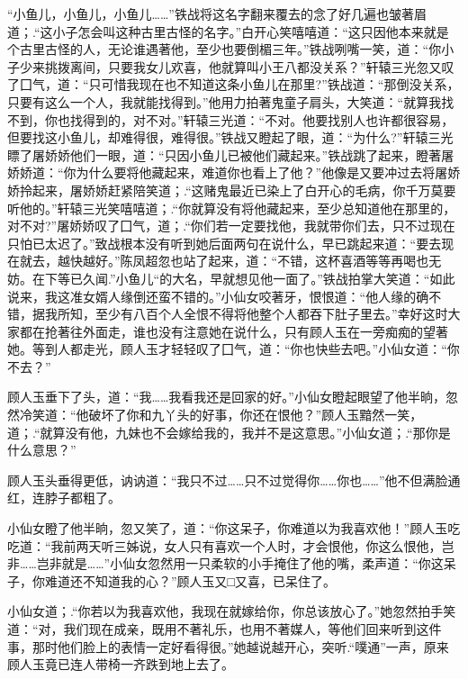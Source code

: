 \documentclass[12pt,oneside]{book}
\begin{document}
``小鱼儿，小鱼儿，小鱼儿\ldots\ldots{}''铁战将这名字翻来覆去的念了好几遍也皱著眉道；.``这小子怎会叫这种古里古怪的名字。''白开心笑嘻嘻道：``这只因他本来就是个古里古怪的人，无论谁遇著他，至少也要倒楣三年。''铁战咧嘴一笑，道：``你小子少来挑拨离间，只要我女儿欢喜，他就算叫小王八都没关系？''轩辕三光忽又叹了囗气，道：``只可惜我现在也不知道这条小鱼儿在那里?''铁战道：``那倒没关系，只要有这么一个人，我就能找得到。''他用力拍著鬼童子肩头，大笑道：``就算我找不到，你也找得到的，对不对。''轩辕三光道：``不对。他要找别人也许都很容易，但要找这小鱼儿，却难得很，难得很。''铁战又瞪起了眼，道：``为什么?''轩辕三光瞟了屠娇娇他们一眼，道：``只因小鱼儿已被他们藏起来。''铁战跳了起来，瞪著屠娇娇道：``你为什么要将他藏起来，难道你也看上了他？''他像是又要冲过去将屠娇娇拎起来，屠娇娇赶紧陪笑道；.``这赌鬼最近已染上了白开心的毛病，你千万莫要听他的。''轩辕三光笑嘻嘻道；.``你就算没有将他藏起来，至少总知道他在那里的，对不对?''屠娇娇叹了囗气，道；.``你们若一定要找他，我就带你们去，只不过现在只怕已太迟了。''致战根本没有听到她后面两句在说什么，早已跳起来道：``要去现在就去，越快越好。''陈凤超忽也站了起来，道：``不错，这杯喜酒等等再喝也无妨。在下等已久闻.''小鱼儿``的大名，早就想见他一面了。''铁战拍掌大笑道：``如此说来，我这准女婿人缘倒还蛮不错的。''小仙女咬著牙，恨恨道：``他人缘的确不错，据我所知，至少有八百个人全恨不得将他整个人都吞下肚子里去。''幸好这时大家都在抢著往外面走，谁也没有注意她在说什么，只有顾人玉在一旁痴痴的望著她。等到人都走光，顾人玉才轻轻叹了囗气，道：``你也快些去吧。''小仙女道：``你不去？''

顾人玉垂下了头，道：``我\ldots\ldots 我看我还是回家的好。''小仙女瞪起眼望了他半晌，忽然冷笑道：``他破坏了你和九丫头的好事，你还在恨他？''顾人玉黯然一笑，道；.``就算没有他，九妹也不会嫁给我的，我并不是这意思。''小仙女道；.``那你是什么意思？''

顾人玉头垂得更低，讷讷道：``我只不过\ldots\ldots 只不过觉得你\ldots\ldots 你也\ldots\ldots{}''他不但满脸通红，连脖子都粗了。

小仙女瞪了他半晌，忽又笑了，道：``你这呆子，你难道以为我喜欢他！''顾人玉吃吃道：``我前两天听三姊说，女人只有喜欢一个人时，才会恨他，你这么恨他，岂非\ldots\ldots 岂非就是\ldots\ldots{}''小仙女忽然用一只柔软的小手掩住了他的嘴，柔声道：``你这呆子，你难道还不知道我的心？''顾人玉又□又喜，已呆住了。

小仙女道；.``你若以为我喜欢他，我现在就嫁给你，你总该放心了。''她忽然拍手笑道：``对，我们现在成亲，既用不著礼乐，也用不著媒人，等他们回来听到这件事，那时他们脸上的表情一定好看得很。''她越说越开心，突听.``噗通''一声，原来顾人玉竟已连人带椅一齐跌到地上去了。
\end{document}
